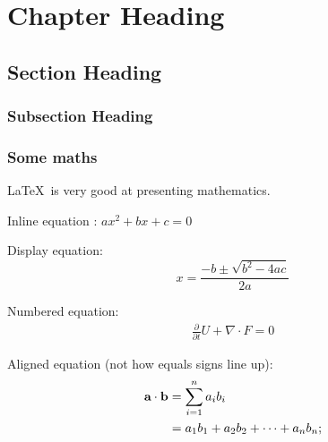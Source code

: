 \chapter{Chapter Heading} %
\label{cha:chapter label} %

\blindtext[1] %

\section{Section Heading} %
\label{sec:section label} %

\blindtext[1]
 
\subsection{Subsection Heading} %
\label{sec:subsection label} %

\blindtext[1]

\subsection{Some maths}


\LaTeX\ is very good at presenting mathematics.

Inline equation :
$ax^2 + bx + c = 0$ %

Display equation:
$$x = \frac{-b \pm \sqrt{b^2 - 4ac}}{2a}$$ %

Numbered equation:
\begin{align}
	\label{eq:equation label} %
	\frac{\partial}{\partial t} U + \nabla \cdot F = 0
\end{align}

Aligned equation (not how equals signs line up):
\begin{align}
	\notag %
	\label{eq:dot product}
	\textbf{a} \cdot \textbf{b} &= \sum_{i=1}^n a_ib_i \\
	&= a_1b_1 + a_2b_2 + \cdots + a_nb_n; %
\end{align}

